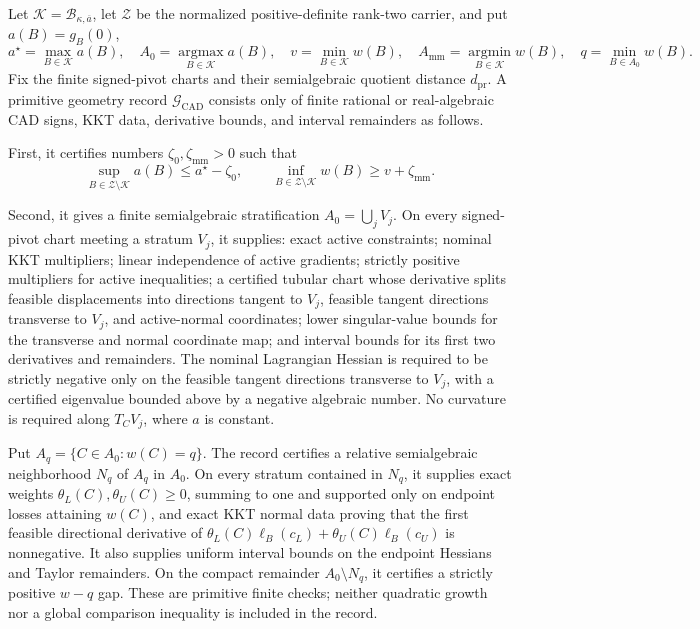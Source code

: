 Let \(\mathcal K=\mathcal B_{\kappa,\overline a}\), let \(\mathcal Z\) be the normalized positive-definite rank-two carrier, and put \(a(B)=g_B(0)\),
\[
a^\star=\max_{B\in\mathcal K}a(B),
\quad A_0=\operatorname*{argmax}_{B\in\mathcal K}a(B),
\quad v=\min_{B\in\mathcal K}w(B),
\quad A_{\mathrm{mm}}=\operatorname*{argmin}_{B\in\mathcal K}w(B),
\quad q=\min_{B\in A_0}w(B).
\]
Fix the finite signed-pivot charts and their semialgebraic quotient distance \(d_{\mathrm{pr}}\).  A primitive geometry record \(\mathscr G_{\mathrm{CAD}}\) consists only of finite rational or real-algebraic CAD signs, KKT data, derivative bounds, and interval remainders as follows.

First, it certifies numbers \(\zeta_0,\zeta_{\mathrm{mm}}>0\) such that
\[
\sup_{B\in\mathcal Z\setminus\mathcal K}a(B)
\le a^\star-\zeta_0,
\qquad
\inf_{B\in\mathcal Z\setminus\mathcal K}w(B)
\ge v+\zeta_{\mathrm{mm}}.
\tag{G1}
\]

Second, it gives a finite semialgebraic stratification \(A_0=\bigcup_j V_j\).  On every signed-pivot chart meeting a stratum \(V_j\), it supplies: exact active constraints; nominal KKT multipliers; linear independence of active gradients; strictly positive multipliers for active inequalities; a certified tubular chart whose derivative splits feasible displacements into directions tangent to \(V_j\), feasible tangent directions transverse to \(V_j\), and active-normal coordinates; lower singular-value bounds for the transverse and normal coordinate map; and interval bounds for its first two derivatives and remainders.  The nominal Lagrangian Hessian is required to be strictly negative only on the feasible tangent directions transverse to \(V_j\), with a certified eigenvalue bounded above by a negative algebraic number.  No curvature is required along \(T_CV_j\), where \(a\) is constant.

Put \(A_q=\{C\in A_0:w(C)=q\}\).  The record certifies a relative semialgebraic neighborhood \(N_q\) of \(A_q\) in \(A_0\).  On every stratum contained in \(N_q\), it supplies exact weights \(\theta_L(C),\theta_U(C)\ge0\), summing to one and supported only on endpoint losses attaining \(w(C)\), and exact KKT normal data proving that the first feasible directional derivative of \(\theta_L(C)\ell_B(c_L)+\theta_U(C)\ell_B(c_U)\) is nonnegative.  It also supplies uniform interval bounds on the endpoint Hessians and Taylor remainders.  On the compact remainder \(A_0\setminus N_q\), it certifies a strictly positive \(w-q\) gap.  These are primitive finite checks; neither quadratic growth nor a global comparison inequality is included in the record.

